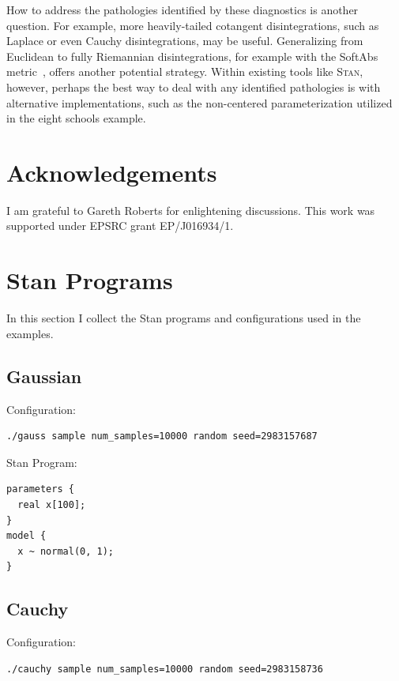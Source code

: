 \documentclass[stslayout]{imsart}
\begin{document}
How to address the pathologies identified by these diagnostics
is another question.  For example, more heavily-tailed cotangent
disintegrations, such as Laplace or even Cauchy disintegrations,
may be useful.  Generalizing from Euclidean to fully Riemannian
disintegrations, for example with the SoftAbs metric~\citep{Betancourt:2013b},
offers another potential strategy.  Within existing tools like \textsc{Stan},
however, perhaps the best way to deal with any identified pathologies is
with alternative implementations, such as the non-centered parameterization
utilized in the eight schools example.

\section{Acknowledgements}

I am grateful to Gareth Roberts for enlightening discussions.  This work
was supported under EPSRC grant EP/J016934/1.

\setcounter{section}{0}
\renewcommand{\thesection}{\Alph{section}}

\section{Stan Programs}

In this section I collect the Stan programs and configurations used in
the examples.

\subsection{Gaussian}

\noindent Configuration:

{\small
\begin{verbatim}
./gauss sample num_samples=10000 random seed=2983157687
\end{verbatim}
}

\noindent Stan Program:

{\small
\begin{verbatim}
parameters {
  real x[100];
}
model {
  x ~ normal(0, 1);
}
\end{verbatim}
}

\subsection{Cauchy}

\noindent Configuration:

{\small
\begin{verbatim}
./cauchy sample num_samples=10000 random seed=2983158736
\end{verbatim}
}
\end{document}
